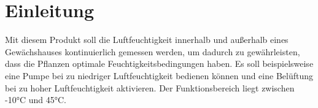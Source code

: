 
\newpage
\tableofcontents
\newpage
\section{Einleitung}
Mit diesem Produkt soll die Luftfeuchtigkeit innerhalb und außerhalb eines Gewächshauses kontinuierlich gemessen werden, um dadurch zu gewährleisten, dass die Pflanzen optimale Feuchtigkeitsbedingungen haben. Es soll beispielsweise eine Pumpe bei zu niedriger Luftfeuchtigkeit bedienen können und eine Belüftung bei zu hoher Luftfeuchtigkeit aktivieren. Der Funktionsbereich liegt zwischen -10°C und 45°C.